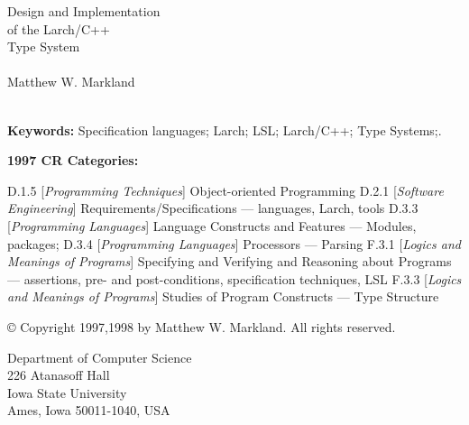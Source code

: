 \documentclass[12pt]{article} %
\begin{document}
\begin{titlepage}
\vspace*{1.2in}
\begin{center}
{\LARGE Design and Implementation\\ of the Larch/C++\\ Type System} \\
~ \\
Matthew W. Markland \\
 ~ \\
\end{center}

\thispagestyle{empty}
\vfill
{\bf Keywords:} Specification languages; Larch; LSL; Larch/C++; Type Systems;.


{\bf 1997 CR Categories:}

\noindent D.1.5 [{\em Programming Techniques}]
        Object-oriented Programming
D.2.1 [{\em Software Engineering\/}]
	Requirements/Spec\-ifications --- languages, Larch,
        tools
D.3.3 [{\em Programming Languages\/}]
        Language Constructs and Features ---  Modules, packages;
D.3.4 [{\em Programming Languages\/}]
        Processors ---  Parsing
F.3.1 [{\em Logics and Meanings of Programs\/}]
        Specifying and Verifying and Reasoning about Programs ---
                assertions, pre- and post-conditions,
                specification techniques, LSL
F.3.3 [{\em Logics and Meanings of Programs\/}]
        Studies of Program Constructs --- Type Structure

\vspace*{0.2in}



\copyright{} 
        Copyright 1997,1998 by Matthew W. Markland.
        All rights reserved.
\begin{center}
Department of Computer Science \\
226 Atanasoff Hall \\
Iowa State University \\
Ames, Iowa 50011-1040, USA
\end{center}
\end{titlepage}
\newpage
\tableofcontents
\newpage
\listoffigures
\newpage
\end{document}
